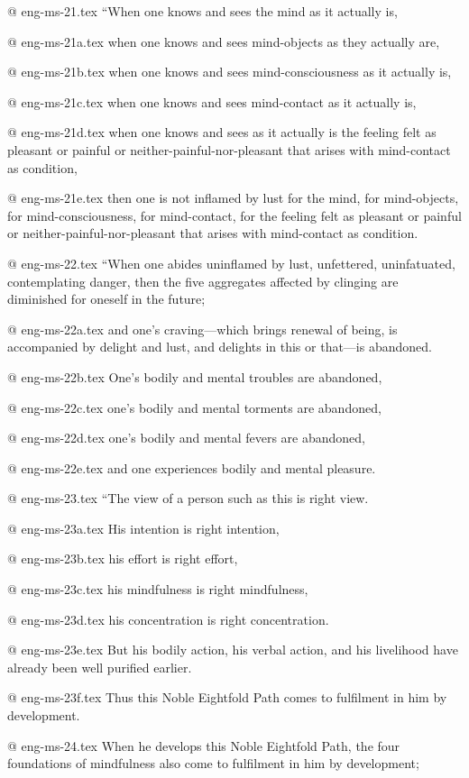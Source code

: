 @ eng-ms-21.tex
“When one knows and sees the mind as it actually is,

@ eng-ms-21a.tex
when one knows and sees mind-objects as they actually are,

@ eng-ms-21b.tex
when one knows and sees mind-consciousness as it actually is,

@ eng-ms-21c.tex
when one knows and sees mind-contact as it actually is,

@ eng-ms-21d.tex
when one knows and sees as it actually is the feeling felt as pleasant or painful or neither-painful-nor-pleasant that arises with mind-contact as condition,

@ eng-ms-21e.tex
then one is not inflamed by lust for the mind, for mind-objects, for mind-consciousness, for mind-contact, for the feeling felt as pleasant or painful or neither-painful-nor-pleasant that arises with mind-contact as condition.

@ eng-ms-22.tex
“When one abides uninflamed by lust, unfettered, uninfatuated, contemplating danger, then the five aggregates affected by clinging are diminished for oneself in the future;

@ eng-ms-22a.tex
and one’s craving—which brings renewal of being, is accompanied by delight and lust, and delights in this or that—is abandoned.

@ eng-ms-22b.tex
One’s bodily and mental troubles are abandoned,

@ eng-ms-22c.tex
one’s bodily and mental torments are abandoned,

@ eng-ms-22d.tex
one’s bodily and mental fevers are abandoned,

@ eng-ms-22e.tex
and one experiences bodily and mental pleasure.

@ eng-ms-23.tex
“The view of a person such as this is right view.

@ eng-ms-23a.tex
His intention is right intention,

@ eng-ms-23b.tex
his effort is right effort,

@ eng-ms-23c.tex
his mindfulness is right mindfulness,

@ eng-ms-23d.tex
his concentration is right concentration.

@ eng-ms-23e.tex
But his bodily action, his verbal action, and his livelihood have already been well purified earlier.

@ eng-ms-23f.tex
Thus this Noble Eightfold Path comes to fulfilment in him by development.

@ eng-ms-24.tex
When he develops this Noble Eightfold Path, the four foundations of mindfulness also come to fulfilment in him by development;


